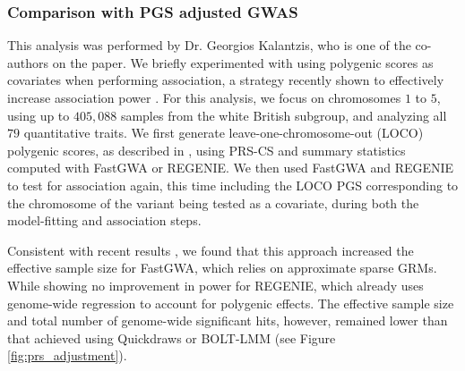 \subsubsection{Comparison with PGS adjusted GWAS}

This analysis was performed by Dr. Georgios Kalantzis, who is one of the co-authors on the paper.
%
We briefly experimented with using polygenic scores as covariates when performing association, a strategy recently shown to effectively increase association power \cite{bennett2021controlling, campos2023boosting, jurgens2023adjusting}.
%
For this analysis, we focus on chromosomes $1$ to $5$, using up to $405{,}088$ samples from the white British subgroup, and analyzing all $79$ quantitative traits.
%
We first generate leave-one-chromosome-out (LOCO) polygenic scores, as described in \cite{bennett2021controlling}, using PRS-CS and summary statistics computed with FastGWA or REGENIE.
%
We then used FastGWA and REGENIE to test for association again, this time including the LOCO PGS corresponding to the chromosome of the variant being tested as a covariate, during both the model-fitting and association steps.

%
Consistent with recent results \cite{bennett2021controlling, jurgens2023adjusting}, we found that this approach increased the effective sample size for FastGWA, which relies on approximate sparse GRMs.
%
While showing no improvement in power for REGENIE, which already uses genome-wide regression to account for polygenic effects.
%
The effective sample size and total number of genome-wide significant hits, however, remained lower than that achieved using Quickdraws or BOLT-LMM (see Figure \ref{fig:prs_adjustment}).
%

